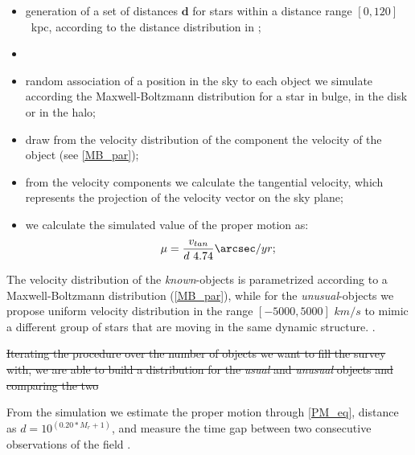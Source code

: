 \begin{itemize}
    \item generation of a set of distances $\mathbf{d}$ for stars within a distance range $[0,120]$~kpc, according to the distance distribution in \citet{Binney2008};
    \item {}
    \item random association of a position in the sky to each object we simulate according the Maxwell-Boltzmann distribution for a star in  bulge, in the disk or in the halo; 
    \item draw from the velocity distribution of the component the velocity of the object (see \autoref{MB_par});
    \item from the velocity components we calculate the tangential velocity, which represents the projection of the velocity vector on the sky plane;
    \item we calculate the simulated value of the proper motion as:
    \begin{equation}\label{PM_eq}
        \mu=\frac{v_{tan}}{d~4.74}  \arcsec/yr;
    \end{equation}
\end{itemize}



The velocity distribution of the \emph{known}-objects is parametrized according to a Maxwell-Boltzmann distribution (\autoref{MB_par}), while for the \emph{unusual}-objects we propose uniform velocity distribution in the range $\left[-5000,5000\right]$ $km/s$ to mimic a different group of stars that are moving in the same dynamic structure. . 

\sout{Iterating the procedure over the number of objects we want to fill the survey with, we are able to build a distribution for the \emph{usual} and \emph{unusual} objects and comparing the two} 


From the simulation we estimate the proper motion through  \autoref{PM_eq},  distance as $d=10^{(0.20*M_r+1)}$, and measure the time gap between two consecutive observations of the field . 

